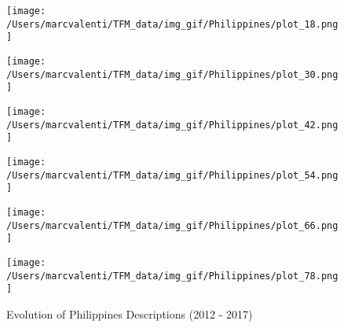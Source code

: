 \begin{figure}[h!] 
  \label{ fig7} 
  \begin{minipage}[b]{0.5\linewidth}
    \centering
    \texttt{[image: /Users/marcvalenti/TFM\_data/img\_gif/Philippines/plot\_18.png]} 
    \vspace{2ex}
  \end{minipage}%
  \begin{minipage}[b]{0.5\linewidth}
    \centering
    \texttt{[image: /Users/marcvalenti/TFM\_data/img\_gif/Philippines/plot\_30.png]} 
    \vspace{2ex}
  \end{minipage} 
  \begin{minipage}[b]{0.5\linewidth}
    \centering
    \texttt{[image: /Users/marcvalenti/TFM\_data/img\_gif/Philippines/plot\_42.png]} 
    \vspace{2ex}
  \end{minipage}%
  \begin{minipage}[b]{0.5\linewidth}
    \centering
    \texttt{[image: /Users/marcvalenti/TFM\_data/img\_gif/Philippines/plot\_54.png]} 
    \vspace{2ex}
  \end{minipage} 
  \begin{minipage}[b]{0.5\linewidth}
    \centering
    \texttt{[image: /Users/marcvalenti/TFM\_data/img\_gif/Philippines/plot\_66.png]} 
    \vspace{2ex}
  \end{minipage}%
  \begin{minipage}[b]{0.5\linewidth}
    \centering
    \texttt{[image: /Users/marcvalenti/TFM\_data/img\_gif/Philippines/plot\_78.png]} 
    \vspace{2ex}
  \end{minipage}%
  \caption{Evolution of Philippines Descriptions (2012 - 2017)}
  \label{fig:pca_evol}
\end{figure}


